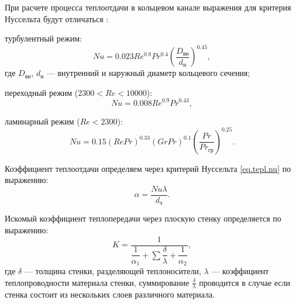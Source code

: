 При расчете процесса теплоотдачи в кольцевом канале выражения для критерия Нуссельта будут отличаться \cite{dit_posobie}:

турбулентный режим:
\begin{equation}
Nu=0.023 Re^{0.8} Pr^{0.4} \left(\dfrac{D_{вн}}{d_{н}}\right)^{0.45},
\end{equation}
где $D_{вн}$, $d_н$ --- внутренний и наружный  диаметр кольцевого сечения;

переходный режим ($2300 < Re < 10000$):
\begin{equation}
	Nu=0.008 Re^{0.9} Pr^{0.43},
\end{equation}

ламинарный режим ($Re < 2300$):
\begin{equation}
Nu=0.15 (Re Pr)^{0.33} (Gr Pr)^{0.1} \left( \dfrac{Pr}{Pr_{гр}} \right) ^{0.25}.
\end{equation}

Коэффициент теплоотдачи определяем через критерий Нуссельта \eqref{eq.tepl.nu} по выражению:
\begin{equation}
\alpha = \dfrac{Nu \lambda}{d_э}.
\end{equation}


Искомый коэффициент теплопередачи через плоскую стенку определяется по выражению:
\begin{equation}
	K=\dfrac{1}{\dfrac{1}{\alpha_1} + \sum \dfrac{\delta}{\lambda} + \dfrac{1}{\alpha_2}},
\end{equation}
где $\delta$ --- толщина стенки, разделяющей теплоносители, $\lambda$ --- коэффициент теплопроводности материала стенки, суммирование $\frac{\delta}{\lambda}$ проводится в случае если стенка состоит из нескольких слоев различного материала. 




